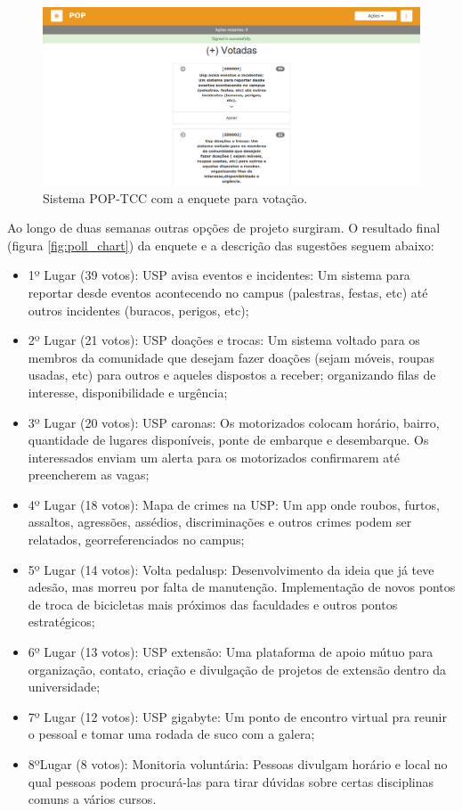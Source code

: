 \begin{figure}[htb]
\includegraphics[width=15cm]{figuras/pop-tcc}
\caption{\label{fig:pop-tcc} Sistema POP-TCC com a enquete para votação.}
\end{figure}
\par Ao longo de duas semanas outras opções de projeto surgiram. O resultado final (figura \ref{fig:poll_chart}) da enquete e a descrição das sugestões seguem abaixo:
\begin{itemize}
\item{ 1º Lugar (39 votos):} USP avisa eventos e incidentes: Um sistema para reportar desde eventos acontecendo no campus (palestras, festas, etc) até outros incidentes (buracos, perigos, etc);
\item {2º Lugar (21 votos):} USP doações e trocas: Um sistema voltado para os membros da comunidade que desejam fazer doações (sejam móveis, roupas usadas, etc) para outros e aqueles dispostos a receber; organizando filas de interesse, disponibilidade e urgência;
\item {3º Lugar (20 votos):} USP caronas: Os motorizados colocam horário, bairro, quantidade de lugares disponíveis, ponte de embarque e desembarque. Os interessados enviam um alerta para os motorizados confirmarem até preencherem as vagas;
\item {4º Lugar (18 votos):} Mapa de crimes na USP: Um app onde roubos, furtos, assaltos, agressões, assédios, discriminações e outros crimes podem ser relatados, georreferenciados no campus;
\item {5º Lugar (14 votos):} Volta pedalusp: Desenvolvimento da ideia que já teve adesão, mas morreu por falta de manutenção. Implementação de novos pontos de troca de bicicletas mais próximos das faculdades e outros pontos estratégicos;
\item {6º Lugar (13 votos): } USP extensão: Uma plataforma de apoio mútuo para organização, contato, criação e divulgação de projetos de extensão dentro da universidade;
\item {7º Lugar (12 votos):} USP gigabyte: Um ponto de encontro virtual pra reunir o pessoal e tomar uma rodada de suco com a galera;
\item {8ºLugar (8 votos):} Monitoria voluntária: Pessoas divulgam horário e local no qual pessoas podem procurá-las para tirar dúvidas sobre certas disciplinas comuns a vários cursos.
\end{itemize}
